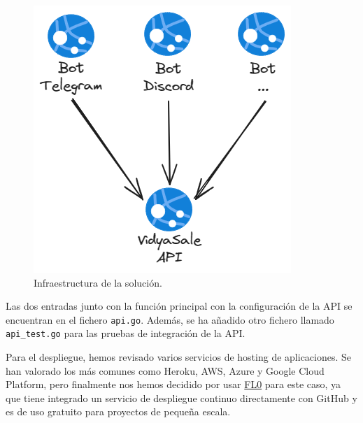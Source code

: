 \begin{figure}[h]
    \centering
    \includegraphics[scale=0.5]{figuras/infraestructura-solucion.png}
    \caption{Infraestructura de la solución.}
    \label{fig:infraestructura}
\end{figure}

Las dos entradas junto con la función principal con la configuración de la API se 
encuentran en el fichero \verb|api.go|. Además, se ha añadido otro fichero llamado 
\verb|api_test.go| para las pruebas de integración de la API.

Para el despliegue, hemos revisado varios servicios de hosting de aplicaciones. Se 
han valorado los más comunes como Heroku, AWS, Azure y Google Cloud Platform, pero 
finalmente nos hemos decidido por usar \href{https://www.fl0.com}{FL0} para 
este caso, ya que tiene integrado un servicio de despliegue continuo directamente 
con GitHub y es de uso gratuito para proyectos de pequeña escala.
